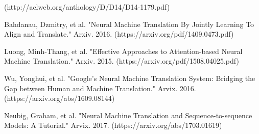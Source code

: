 \documentclass[10pt,a4paper]{article}
\begin{document}
(http://aclweb.org/anthology/D/D14/D14-1179.pdf)
\newline

Bahdanau, Dzmitry, et al. "Neural Machine Translation By Jointly Learning To Align and Translate." Arxiv. 2016.
(https://arxiv.org/pdf/1409.0473.pdf)
\newline

Luong, Minh-Thang, et al. "Effective Approaches to Attention-based Neural Machine Translation." Arxiv. 2015.
(https://arxiv.org/pdf/1508.04025.pdf)
\newline

Wu, Yonghui, et al. "Google’s Neural Machine Translation System: Bridging the Gap between Human and Machine Translation." Arvix. 2016.
(https://arxiv.org/abs/1609.08144)
\newline

Neubig, Graham, et al. "Neural Machine Translation and Sequence-to-sequence Models: A Tutorial." Arvix. 2017.
(https://arxiv.org/abs/1703.01619)
\newline
\end{document}
